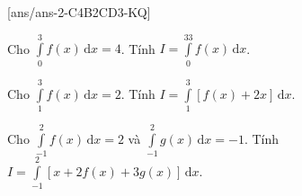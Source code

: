 [ans/ans-2-C4B2CD3-KQ]
\TNSA

\begin{ex}%
	Cho $\int\limits_0^3f(x)\mathrm{\,d}x=4$. Tính $I=\int\limits_0^33f(x)\mathrm{\,d}x$.\\
\end{ex}
\begin{ex}%
	Cho $\int\limits_1^3f(x)\mathrm{\,d}x=2$. Tính $I=\int\limits_1^3\left[f(x)+2x\right]\mathrm{\,d}x$.\\
\end{ex}

\begin{ex}%
	Cho $\int\limits_{-1}^2f(x)\mathrm{\,d}x=2$ và $\int\limits_{-1}^2g(x)\mathrm{\,d}x=-1$. Tính $ I=\int\limits_{-1}^2\left[x+2f(x)+3g(x)\right]\mathrm{\,d}x$.\\
\end{ex}

